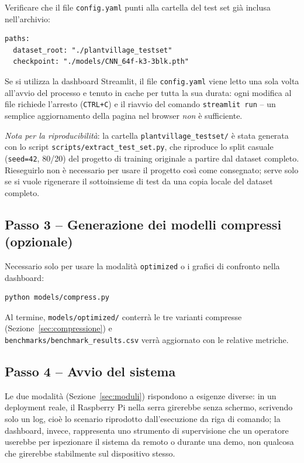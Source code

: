 Verificare che il file \texttt{config.yaml} punti alla cartella del test
set già inclusa nell'archivio:

\begin{lstlisting}[language={}]
paths:
  dataset_root: "./plantvillage_testset"
  checkpoint: "./models/CNN_64f-k3-3blk.pth"
\end{lstlisting}

\begin{warnbox}
Se si utilizza la dashboard Streamlit, il file \texttt{config.yaml} viene
letto una sola volta all'avvio del processo e tenuto in cache per tutta la
sua durata: ogni modifica al file richiede l'arresto (\texttt{CTRL+C}) e il
riavvio del comando \texttt{streamlit run} -- un semplice aggiornamento
della pagina nel browser \emph{non} è sufficiente.
\end{warnbox}

\emph{Nota per la riproducibilità}: la cartella \texttt{plantvillage\_testset/}
è stata generata con lo script \texttt{scripts/extract\_test\_set.py}, che
riproduce lo split casuale (\texttt{seed=42}, 80/20) del progetto di
training originale a partire dal dataset completo. Rieseguirlo non è
necessario per usare il progetto così come consegnato; serve solo se si
vuole rigenerare il sottoinsieme di test da una copia locale del dataset
completo.

\subsection{Passo 3 -- Generazione dei modelli compressi (opzionale)}

Necessario solo per usare la modalità \texttt{optimized} o i grafici di
confronto nella dashboard:

\begin{lstlisting}[language=bash]
python models/compress.py
\end{lstlisting}

Al termine, \texttt{models/optimized/} conterrà le tre varianti compresse
(Sezione~\ref{sec:compressione}) e \\ \texttt{benchmarks/benchmark\_results.csv}
verrà aggiornato con le relative metriche.

\subsection{Passo 4 -- Avvio del sistema}

Le due modalità (Sezione~\ref{sec:moduli}) rispondono a esigenze diverse: in
un deployment reale, il Raspberry Pi nella serra girerebbe senza schermo,
scrivendo solo un log, cioè lo scenario riprodotto dall'esecuzione da riga di
comando; la dashboard, invece, rappresenta uno strumento di supervisione
che un operatore userebbe per ispezionare il sistema da remoto o durante
una demo, non qualcosa che girerebbe stabilmente sul dispositivo stesso.

